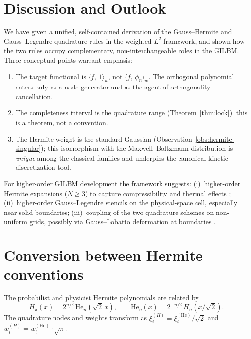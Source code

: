 \documentclass[11pt,a4paper]{article}
\theoremstyle{definition}
\newcommand{\ipw}[2]{\langle #1,\, #2 \rangle_{w}}
\newcommand{\HE}{\mathrm{He}}
\begin{document}
\section{Discussion and Outlook}\label{sec:disc}

We have given a unified, self-contained derivation of the Gauss--Hermite and
Gauss--Legendre quadrature rules in the weighted-$L^2$ framework, and shown how
the two rules occupy complementary, non-interchangeable roles in the GILBM.
Three conceptual points warrant emphasis:
\begin{enumerate}\itemsep0pt
  \item The target functional is $\ipw{f}{1}$, not $\ipw{f}{\phi_n}$. The
        orthogonal polynomial enters only as a node generator and as the agent
        of orthogonality cancellation.
  \item The completeness interval is the quadrature range
        (Theorem~\ref{thm:lock}); this is a theorem, not a convention.
  \item The Hermite weight is the standard Gaussian
        (Observation~\ref{obs:hermite-singular}); this isomorphism with the
        Maxwell--Boltzmann distribution is \emph{unique} among the classical
        families and underpins the canonical kinetic-discretization tool.
\end{enumerate}

For higher-order GILBM development the framework suggests:
(i)~higher-order Hermite expansions ($N\ge 3$) to capture compressibility and
thermal effects \cite{ShanYuanChen2006,Frapolli2014};
(ii)~higher-order Gauss--Legendre stencils on the physical-space cell,
especially near solid boundaries;
(iii)~coupling of the two quadrature schemes on non-uniform grids, possibly via
Gauss--Lobatto deformation at boundaries \cite{HesthavenWarburton2008}.

\appendix

\section{Conversion between Hermite conventions}\label{app:conv}

The probabilist and physicist Hermite polynomials are related by
\[
  H_n(x)=2^{n/2}\,\HE_n(\sqrt{2}\,x),\qquad
  \HE_n(x)=2^{-n/2}\,H_n(x/\sqrt{2}).
\]
The quadrature nodes and weights transform as
\(
  \xi_i^{(H)}=\xi_i^{(\HE)}/\sqrt{2}
\)
and
\(
  w_i^{(H)}=w_i^{(\HE)}\cdot\sqrt{\pi}
\).
\end{document}
